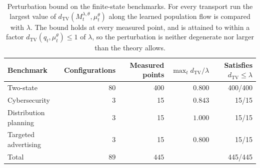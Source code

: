 \begin{table}[H]
\centering
\begin{tabular}{lrrrr}
\toprule
Benchmark & Configurations & Measured points & $\max_t d_{\mathrm{TV}}/\lambda$ & Satisfies $d_{\mathrm{TV}}\leq\lambda$ \\
\midrule
Two-state & 80 & 400 & $0.800$ & 400/400 \\
Cybersecurity & 3 & 15 & $0.843$ & 15/15 \\
Distribution planning & 3 & 15 & $1.000$ & 15/15 \\
Targeted advertising & 3 & 15 & $0.800$ & 15/15 \\
\midrule
Total & $89$ & $445$ & & 445/445 \\
\bottomrule
\end{tabular}
\caption{Perturbation bound on the finite-state benchmarks. For every transport run the largest value of $d_{\mathrm{TV}}(M_t^{\lambda,\theta},\mu_t^\theta)$ along the learned population flow is compared with $\lambda$. The bound holds at every measured point, and is attained to within a factor $d_{\mathrm{TV}}(q_t,\mu_t^\theta)\leq1$ of $\lambda$, so the perturbation is neither degenerate nor larger than the theory allows.}
\label{tab:tv-bounds}
\end{table}
